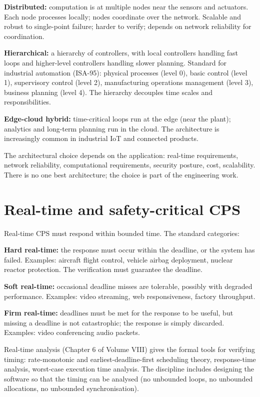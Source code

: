 \textbf{Distributed:} computation is at multiple nodes near the sensors and actuators. Each node processes locally; nodes coordinate over the network. Scalable and robust to single-point failure; harder to verify; depends on network reliability for coordination.

\textbf{Hierarchical:} a hierarchy of controllers, with local controllers handling fast loops and higher-level controllers handling slower planning. Standard for industrial automation (ISA-95): physical processes (level 0), basic control (level 1), supervisory control (level 2), manufacturing operations management (level 3), business planning (level 4). The hierarchy decouples time scales and responsibilities.

\textbf{Edge-cloud hybrid:} time-critical loops run at the edge (near the plant); analytics and long-term planning run in the cloud. The architecture is increasingly common in industrial IoT and connected products.

The architectural choice depends on the application: real-time requirements, network reliability, computational requirements, security posture, cost, scalability. There is no one best architecture; the choice is part of the engineering work.

\section{Real-time and safety-critical CPS}

Real-time CPS must respond within bounded time. The standard categories:

\textbf{Hard real-time:} the response must occur within the deadline, or the system has failed. Examples: aircraft flight control, vehicle airbag deployment, nuclear reactor protection. The verification must guarantee the deadline.

\textbf{Soft real-time:} occasional deadline misses are tolerable, possibly with degraded performance. Examples: video streaming, web responsiveness, factory throughput.

\textbf{Firm real-time:} deadlines must be met for the response to be useful, but missing a deadline is not catastrophic; the response is simply discarded. Examples: video conferencing audio packets.

Real-time analysis (Chapter 6 of Volume VIII) gives the formal tools for verifying timing: rate-monotonic and earliest-deadline-first scheduling theory, response-time analysis, worst-case execution time analysis. The discipline includes designing the software so that the timing can be analysed (no unbounded loops, no unbounded allocations, no unbounded synchronisation).

